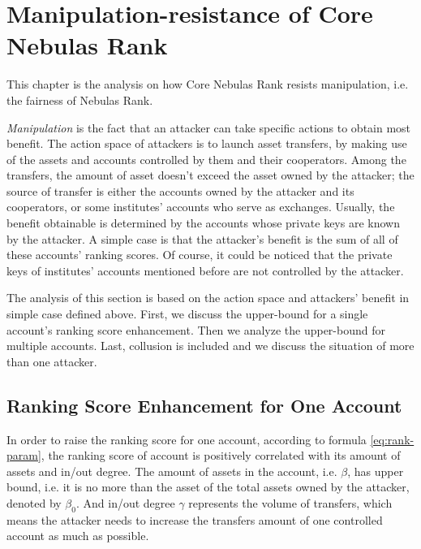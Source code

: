 
\section{Manipulation-resistance of Core Nebulas Rank}

This chapter is the analysis on how Core Nebulas Rank resists manipulation, i.e. the fairness of Nebulas Rank.

\emph{Manipulation} is the fact that an attacker can take specific actions to obtain most benefit. The action space of attackers is to launch asset transfers, by making use of the assets and accounts controlled by them and their cooperators. Among the transfers, the amount of asset doesn't exceed the asset owned by the attacker; the source of transfer is either the accounts owned by the attacker and its cooperators, or some institutes' accounts who serve as exchanges. Usually, the benefit obtainable is determined by the accounts whose private keys are known by the attacker. A simple case is that the attacker's benefit is the sum of all of these accounts' ranking scores. Of course, it could be noticed that the private keys of institutes' accounts mentioned before are not controlled by the attacker.

The analysis of this section is based on the action space and attackers' benefit in simple case defined above. First, we discuss the upper-bound for a single account's ranking score enhancement. Then we analyze the upper-bound for multiple accounts. Last, collusion is included and we discuss the situation of more than one attacker.

\subsection{Ranking Score Enhancement for One Account \label{sec:cheat-single}}

In order to raise the ranking score for one account, according to formula \ref{eq:rank-param}, the ranking score of account is positively correlated with its amount of assets and in/out degree. The amount of assets in the account, i.e. $\beta$, has upper bound, i.e. it is no more than the asset of the total assets owned by the attacker, denoted by $\beta_0$. And in/out degree $\gamma$ represents the volume of transfers, which means the attacker needs to increase the transfers amount of one controlled account as much as possible.

